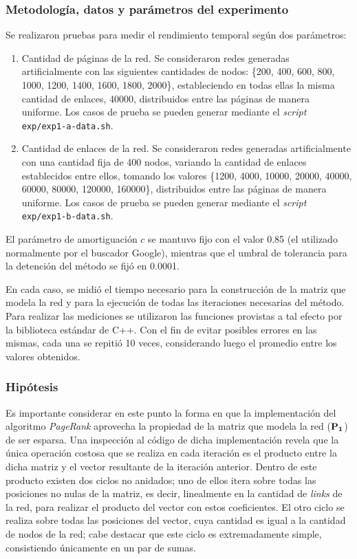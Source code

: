             \subsubsection*{Metodología, datos y parámetros del experimento}
                Se realizaron pruebas para medir el rendimiento temporal según dos parámetros:
                \begin{enumerate}[label=(\alph*)]
                    \item Cantidad de páginas de la red. Se consideraron redes generadas artificialmente con las siguientes cantidades de nodos: \{200, 400, 600, 800, 1000, 1200, 1400, 1600, 1800, 2000\}, estableciendo en todas ellas la misma cantidad de enlaces, 40000, distribuidos entre las páginas de manera uniforme. Los casos de prueba se pueden generar mediante el \emph{script} \texttt{exp/exp1-a-data.sh}.

                    \item Cantidad de enlaces de la red. Se consideraron redes generadas artificialmente con una cantidad fija de 400 nodos, variando la cantidad de enlaces establecidos entre ellos, tomando los valores \{1200, 4000, 10000, 20000, 40000, 60000, 80000, 120000, 160000\}, distribuidos entre las páginas de manera uniforme. Los casos de prueba se pueden generar mediante el \emph{script} \texttt{exp/exp1-b-data.sh}.
                \end{enumerate}

                El parámetro de amortiguación $c$ se mantuvo fijo con el valor 0.85 (el utilizado normalmente por el buscador Google\cite{Brin1998}), mientras que el umbral de tolerancia para la detención del método se fijó en 0.0001.

                En cada caso, se midió el tiempo necesario para la construcción de la matriz que modela la red y para la ejecución de todas las iteraciones necesarias del método. Para realizar las mediciones se utilizaron las funciones provistas a tal efecto por la biblioteca estándar de C++. Con el fin de evitar posibles errores en las mismas, cada una se repitió 10 veces, considerando luego el promedio entre los valores obtenidos.

            \subsubsection*{Hipótesis}
            Es importante considerar en este punto la forma en que la implementación del algoritmo \emph{PageRank} aprovecha la propiedad de la matriz que modela la red ($\mathbf{P_1}$) de ser esparsa. Una inspección al código de dicha implementación revela que la única operación costosa que se realiza en cada iteración es  el producto entre la dicha matriz y el vector resultante de la iteración anterior. Dentro de este producto existen dos ciclos no anidados; uno de ellos itera sobre todas las posiciones no nulas de la matriz, es decir, linealmente en la cantidad de \emph{links} de la red, para realizar el producto del vector con estos coeficientes. El otro ciclo se realiza sobre todas las posiciones del vector, cuya cantidad es igual a la cantidad de nodos de la red; cabe destacar que este ciclo es extremadamente simple, consistiendo únicamente en un par de sumas.

